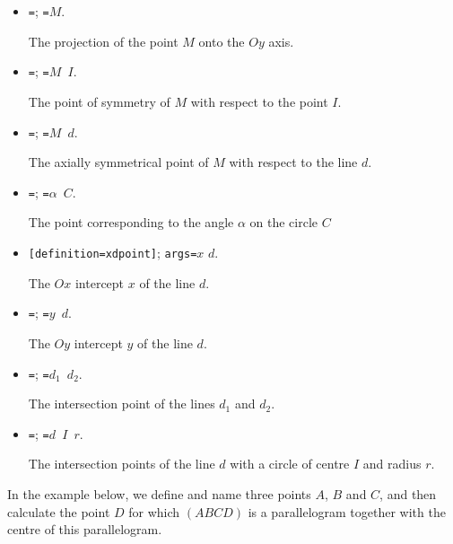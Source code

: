 \begin{itemize}
\item \texttt{=};
\texttt{=$M$}.

The projection of the point $M$ onto the $Oy$
axis.

\item \texttt{=};
\texttt{=$M$ $I$}.

The point of symmetry of $M$ with respect
to the point $I$.

\item \texttt{=};
\texttt{=$M$ $d$}.

The axially symmetrical point of $M$ with
respect to the line $d$.

\item \texttt{=};
\texttt{=$\alpha $ $C$}.

The point corresponding to the
angle $\alpha $ on the circle $C$

\item \texttt{[definition=xdpoint]};
\verb+args=+$x$ $d$.

The $Ox$ intercept $x$ of the line $d$.

\item \texttt{=};
\texttt{=$y$ $d$}.

The $Oy$ intercept $y$ of the line $d$.

\item \texttt{=};
\texttt{=$d_1$ $d_2$}.

The intersection point of the lines
$d_1$ and $d_2$.

\item \texttt{=};
\texttt{=$d$ $I$ $r$}.

The intersection points of the line
$d$ with a circle of centre $I$ and radius $r$.

\end{itemize}

In the example below, we define and name three points $A$, $B$ and
$C$, and then calculate the point $D$ for which $(ABCD)$ is a
parallelogram together with the centre of this parallelogram.

